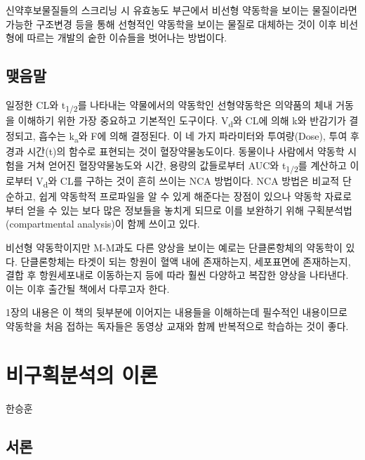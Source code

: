 \documentclass[
  11pt,
  krantz2, a4paper, twoside]{krantz}
\theoremstyle{definition}
\theoremstyle{definition}
\theoremstyle{definition}
\theoremstyle{definition}
\theoremstyle{remark}
\begin{document}
신약후보물질들의 스크리닝 시 유효농도 부근에서 비선형 약동학을 보이는 물질이라면 가능한 구조변경 등을 통해 선형적인 약동학을 보이는 물질로 대체하는 것이 이후 비선형에 따르는 개발의 숱한 이슈들을 벗어나는 방법이다.

\hypertarget{uxb9fauxc74cuxb9d0}{%
\section{맺음말}\label{uxb9fauxc74cuxb9d0}}

일정한 CL와 t\textsubscript{1/2}를 나타내는 약물에서의 약동학인 선형약동학은 의약품의 체내 거동을 이해하기 위한 가장 중요하고 기본적인 도구이다. 
V\textsubscript{d}와 CL에 의해 k와 반감기가 결정되고, 흡수는 k\textsubscript{a}와 F에 의해 결정된다. 
이 네 가지 파라미터와 투여량(Dose), 투여 후 경과 시간(t)의 함수로 표현되는 것이 혈장약물농도이다.
동물이나 사람에서 약동학 시험을 거쳐 얻어진 혈장약물농도와 시간, 용량의 값들로부터 AUC와 t\textsubscript{1/2}를 계산하고 이로부터 V\textsubscript{d}와 CL를 구하는 것이 흔히 쓰이는 NCA 방법이다. 
NCA 방법은 비교적 단순하고, 쉽게 약동학적 프로파일을 알 수 있게 해준다는 장점이 있으나 약동학 자료로부터 얻을 수 있는 보다 많은 정보들을 놓치게 되므로 이를 보완하기 위해 구획분석법(compartmental analysis)이 함께 쓰이고 있다.

비선형 약동학이지만 M-M과도 다른 양상을 보이는 예로는 단클론항체의 약동학이 있다. 
단클론항체는 타겟이 되는 항원이 혈액 내에 존재하는지, 세포표면에 존재하는지, 결합 후 항원세포내로 이동하는지 등에 따라 훨씬 다양하고 복잡한 양상을 나타낸다. 
이는 이후 출간될 책에서 다루고자 한다.

1장의 내용은 이 책의 뒷부분에 이어지는 내용들을 이해하는데 필수적인 내용이므로 약동학을 처음 접하는 독자들은 동영상 교재와 함께 반복적으로 학습하는 것이 좋다.

\hypertarget{uxbe44uxad6cuxd68duxbd84uxc11duxc758-uxc774uxb860}{%
\chapter{비구획분석의 이론}\label{uxbe44uxad6cuxd68duxbd84uxc11duxc758-uxc774uxb860}}

\Large\hfill

한승훈
\normalsize

\hypertarget{uxc11cuxb860-1}{%
\section{서론}\label{uxc11cuxb860-1}}
\end{document}

